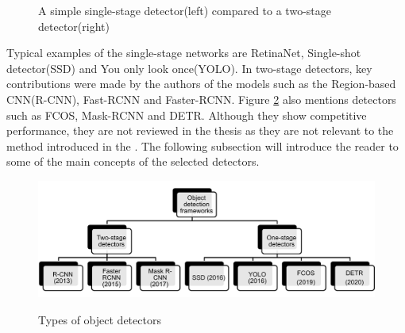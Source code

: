 \documentclass[english, 12pt, a4paper, elec, utf8, a-1b, online]{aaltothesis}
\begin{document}
\begin{figure}[htb]
    \centering
    \qquad
    \caption{A simple single-stage detector(left) compared to a two-stage detector(right)}\cite{app8091488}
    \label{fig:1vs2stage}%
\end{figure}
\FloatBarrier

Typical examples of the single-stage networks are RetinaNet\cite{Lin2017}, Single-shot detector(SSD)\cite{Liu2015}  and You only look once(YOLO)\cite{Redmon2015a}. In two-stage detectors, key contributions were made by the authors of the models such as the Region-based CNN(R-CNN)\cite{Girshick2013}, Fast-RCNN\cite{Girshick2015} and Faster-RCNN\cite{ima}. Figure \ref{OD} also mentions detectors such as FCOS\cite{Tian2019}, Mask-RCNN\cite{He2017} and DETR\cite{Carion2020}. Although they show competitive performance, they are not reviewed in the thesis as they are not relevant to the method introduced in the .  The following subsection will introduce the reader to some of the main concepts of the selected detectors. 

\begin{figure}[htb]
	\begin{center}
		\includegraphics[width=16cm]{./OD.png}
	\end{center}
	\caption{Types of object detectors}
	\begin{center}
		\label{OD}
	\end{center}
\end{figure}
\FloatBarrier
\end{document}
